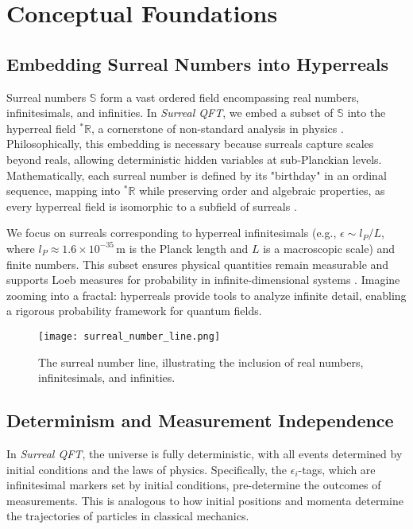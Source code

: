 \documentclass{article}
\begin{document}
\section{Conceptual Foundations}
\subsection{Embedding Surreal Numbers into Hyperreals}
Surreal numbers \(\mathbb{S}\) form a vast ordered field encompassing real numbers, infinitesimals, and infinities. In \textit{Surreal QFT}, we embed a subset of \(\mathbb{S}\) into the hyperreal field \({}^*\mathbb{R}\), a cornerstone of non-standard analysis in physics \cite{Goldblatt1998}. Philosophically, this embedding is necessary because surreals capture scales beyond reals, allowing deterministic hidden variables at sub-Planckian levels. Mathematically, each surreal number is defined by its "birthday" in an ordinal sequence, mapping into \({}^*\mathbb{R}\) while preserving order and algebraic properties, as every hyperreal field is isomorphic to a subfield of surreals \cite{Ehrlich2012}.

We focus on surreals corresponding to hyperreal infinitesimals (e.g., \(\epsilon \sim l_P / L\), where \(l_P \approx 1.6 \times 10^{-35} \, \text{m}\) is the Planck length and \(L\) is a macroscopic scale) and finite numbers. This subset ensures physical quantities remain measurable and supports Loeb measures for probability in infinite-dimensional systems \cite{Albeverio1986}. Imagine zooming into a fractal: hyperreals provide tools to analyze infinite detail, enabling a rigorous probability framework for quantum fields.

\begin{figure}[htbp]
    \centering
    \texttt{[image: surreal\_number\_line.png]}
    \caption{The surreal number line, illustrating the inclusion of real numbers, infinitesimals, and infinities.}
    \label{fig:surreal_line}
\end{figure}

\subsection{Determinism and Measurement Independence}
In \textit{Surreal QFT}, the universe is fully deterministic, with all events determined by initial conditions and the laws of physics. Specifically, the \(\epsilon_i\)-tags, which are infinitesimal markers set by initial conditions, pre-determine the outcomes of measurements. This is analogous to how initial positions and momenta determine the trajectories of particles in classical mechanics.
\end{document}
